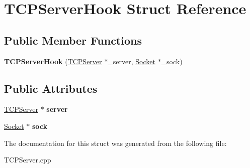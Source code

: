\hypertarget{structTCPServerHook}{\section{T\+C\+P\+Server\+Hook Struct Reference}
\label{structTCPServerHook}
}
\subsection*{Public Member Functions}
\begin{DoxyCompactItemize}
\item 
\hypertarget{structTCPServerHook_a20bf33f010e41733d8967e81faf65d55}{{\bfseries T\+C\+P\+Server\+Hook} (\hyperlink{classTCPServer}{T\+C\+P\+Server} $\ast$\+\_\+server, \hyperlink{classSocket}{Socket} $\ast$\+\_\+sock)}\label{structTCPServerHook_a20bf33f010e41733d8967e81faf65d55}

\end{DoxyCompactItemize}
\subsection*{Public Attributes}
\begin{DoxyCompactItemize}
\item 
\hypertarget{structTCPServerHook_a172cab2c468d3335864ebd568603de38}{\hyperlink{classTCPServer}{T\+C\+P\+Server} $\ast$ {\bfseries server}}\label{structTCPServerHook_a172cab2c468d3335864ebd568603de38}

\item 
\hypertarget{structTCPServerHook_aca27338d2b39429303166c0ec8cb9110}{\hyperlink{classSocket}{Socket} $\ast$ {\bfseries sock}}\label{structTCPServerHook_aca27338d2b39429303166c0ec8cb9110}

\end{DoxyCompactItemize}


The documentation for this struct was generated from the following file\+:\begin{DoxyCompactItemize}
\item 
T\+C\+P\+Server.\+cpp\end{DoxyCompactItemize}
